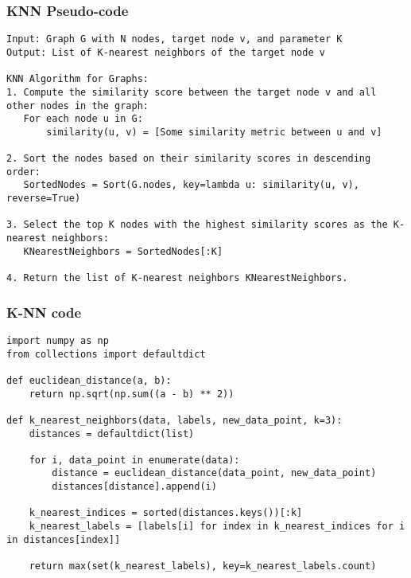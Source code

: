 \begin{frame}[fragile]\frametitle{KNN Pseudo-code}

\begin{lstlisting}[basicstyle=\tiny]
Input: Graph G with N nodes, target node v, and parameter K
Output: List of K-nearest neighbors of the target node v

KNN Algorithm for Graphs:
1. Compute the similarity score between the target node v and all other nodes in the graph:
   For each node u in G:
       similarity(u, v) = [Some similarity metric between u and v]

2. Sort the nodes based on their similarity scores in descending order:
   SortedNodes = Sort(G.nodes, key=lambda u: similarity(u, v), reverse=True)

3. Select the top K nodes with the highest similarity scores as the K-nearest neighbors:
   KNearestNeighbors = SortedNodes[:K]

4. Return the list of K-nearest neighbors KNearestNeighbors.
\end{lstlisting}

\end{frame}

\begin{frame}[fragile]\frametitle{K-NN code}
\begin{lstlisting}[basicstyle=\tiny]
import numpy as np
from collections import defaultdict

def euclidean_distance(a, b):
    return np.sqrt(np.sum((a - b) ** 2))

def k_nearest_neighbors(data, labels, new_data_point, k=3):
    distances = defaultdict(list)

    for i, data_point in enumerate(data):
        distance = euclidean_distance(data_point, new_data_point)
        distances[distance].append(i)

    k_nearest_indices = sorted(distances.keys())[:k]
    k_nearest_labels = [labels[i] for index in k_nearest_indices for i in distances[index]]

    return max(set(k_nearest_labels), key=k_nearest_labels.count)
\end{lstlisting}

\end{frame}



